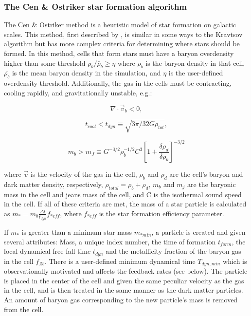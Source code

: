 \subsubsection{The Cen \& Ostriker star formation algorithm}

The Cen \& Ostriker method is a heuristic model of star formation
on galactic scales.  This method, first described by
\citet{CO1992}, is similar in some ways to the Kravtsov algorithm
but has more complex criteria for determining where stars should
be formed.  In this method, cells that form stars must have a 
baryon overdensity higher than some threshold 
$\rho_b/\bar{\rho}_b \geq \eta$ 
where $\rho_b$ is the baryon density in that cell, 
$\bar{\rho_b}$ is the mean baryon density in the simulation,
and $\eta$ is the user-defined overdensity threshold.
Additionally, the gas in the cells must be contracting, 
cooling rapidly, and gravitationally unstable, e.g.:

\begin{equation}
\nabla \cdot \vec{v}_b < 0,
\label{cencont}
\end{equation}

\begin{equation}
t_{cool} < t_{dyn} \equiv \sqrt{3 \pi / 32G \rho_{tot}},
\end{equation}

\begin{equation}
m_{b} > m_{J} \equiv G^{-3/2} \rho_{b}^{-1/2}C^{3}
\left[ 1 + \frac{\delta\rho_{d}}{\delta\rho_{b}} \right]^{-3/2}
\end{equation}

where $\vec{v}$ is the velocity of the gas in the cell, $\rho_{b}$ and 
$\rho_{d}$ are the cell's baryon and dark matter density, respectively,
$\rho_{total} = \rho_{b} + \rho_{d}$, $m_{b}$ and $m_{j}$ are the 
baryonic mass in the cell and jeans mass of the cell, and C is the 
isothermal sound speed in the cell.  
If all of these criteria are met, 
the mass of a star particle is calculated as \(m_{*} = m_{b} 
\frac{ \Delta t}{ t_{dyn} } f_{*eff} \), 
where $f_{*eff}$ is the star formation efficiency parameter.

If $m_{*}$ is greater than a minimum star mass $m_{*min}$, a particle 
is created and given several attributes:  Mass, a unique index number, 
the time of formation $t_{form}$, the local dynamical free-fall time 
$t_{dyn}$ and the metallicity fraction of the baryon gas in the cell 
$f_{Zb}$.  There is a user-defined minimum dynamical time
$T_{dyn,min}$ which is observationally motivated and affects the
feedback rates (see below).
The particle is placed in the center of the cell and given 
the same peculiar velocity as the gas in the cell, and is then treated 
in the same manner as the dark matter particles.  An 
amount of baryon gas corresponding to the new particle's mass is 
removed from the cell.  

